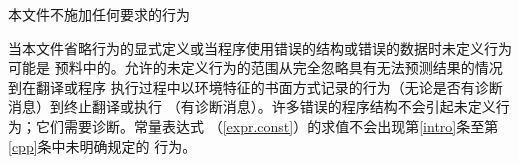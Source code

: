 本文件不施加任何要求的行为

\begin{note}[\noindent]
  当本文件省略行为的显式定义或当程序使用错误的结构或错误的数据时未定义行为可能是
  预料中的。允许的未定义行为的范围从完全忽略具有无法预测结果的情况到在翻译或程序
  执行过程中以环境特征的书面方式记录的行为（无论是否有诊断消息）到终止翻译或执行
  （有诊断消息）。许多错误的程序结构不会引起未定义行为；它们需要诊断。常量表达式
  （\ref{expr.const}）的求值不会出现第\ref{intro}条至第\ref{cpp}条中未明确规定的
  行为。
\end{note}
